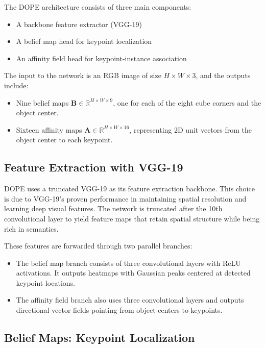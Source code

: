 \documentclass[conference]{IEEEtran}
\begin{document}
The DOPE architecture consists of three main components:
\begin{itemize}
    \item A backbone feature extractor (VGG-19)
    \item A belief map head for keypoint localization
    \item An affinity field head for keypoint-instance association
\end{itemize}

The input to the network is an RGB image of size $H \times W \times 3$, and the outputs include:
\begin{itemize}
    \item Nine belief maps $\mathbf{B} \in \mathbb{R}^{H \times W \times 9}$, one for each of the eight cube corners and the object center.
    \item Sixteen affinity maps $\mathbf{A} \in \mathbb{R}^{H \times W \times 16}$, representing 2D unit vectors from the object center to each keypoint.
\end{itemize}


\subsection{Feature Extraction with VGG-19}

DOPE uses a truncated VGG-19 as its feature extraction backbone. This choice is due to VGG-19’s proven performance in maintaining spatial resolution and learning deep visual features. The network is truncated after the 10th convolutional layer to yield feature maps that retain spatial structure while being rich in semantics.

These features are forwarded through two parallel branches:
\begin{itemize}
    \item The belief map branch consists of three convolutional layers with ReLU activations. It outputs heatmaps with Gaussian peaks centered at detected keypoint locations.
    \item The affinity field branch also uses three convolutional layers and outputs directional vector fields pointing from object centers to keypoints.
\end{itemize}

\subsection{Belief Maps: Keypoint Localization}
\end{document}

